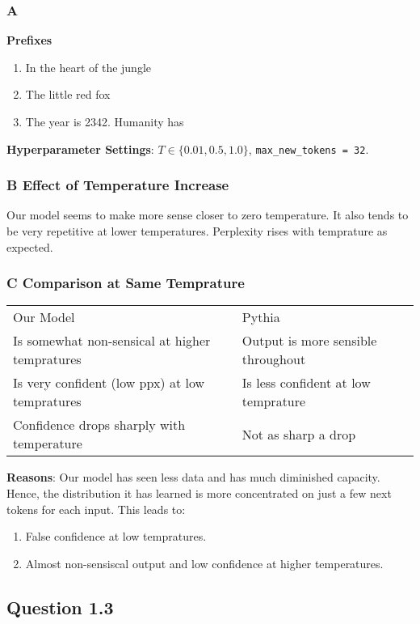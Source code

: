 \documentclass[11pt]{article}
\begin{document}
\subsubsection{A}
\label{sec:org5f3fbb3}
\textbf{Prefixes}
\begin{enumerate}
\item In the heart of the jungle
\item The little red fox
\item The year is 2342. Humanity has
\end{enumerate}
\textbf{Hyperparameter Settings}: \(T \in \{0.01, 0.5, 1.0\}\), \texttt{max\_new\_tokens = 32}.
\subsubsection{B Effect of Temperature Increase}
\label{sec:orgc379fde}
Our model seems to make more sense closer to zero temperature. It also tends to be very repetitive at lower temperatures. Perplexity rises with temprature as expected.
\subsubsection{C Comparison at Same Temprature}
\label{sec:org7c68646}
\begin{center}
\begin{tabular}{ll}
Our Model & Pythia\\[0pt]
Is somewhat non-sensical at higher tempratures & Output is more sensible throughout\\[0pt]
Is very confident (low ppx) at low tempratures & Is less confident at low temprature\\[0pt]
Confidence drops sharply with temperature & Not as sharp a drop\\[0pt]
\end{tabular}
\end{center}
\textbf{Reasons}: Our model has seen less data and has much diminished capacity. Hence, the distribution it has learned is more concentrated on just a few next tokens for each input. This leads to:
\begin{enumerate}
\item False confidence at low tempratures.
\item Almost non-sensiscal output and low confidence at higher temperatures.
\end{enumerate}


\subsection{Question 1.3}
\label{sec:org25dc90d}
\end{document}
